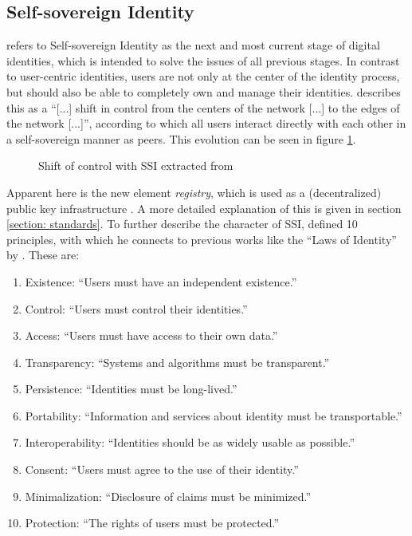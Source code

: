 	    \subsection{Self-sovereign Identity}\label{subsection: stage ssi}
	    \cite{allen_path_2016} refers to Self-sovereign Identity as the next and most current stage of digital identities, which is intended to solve the issues of all previous stages. In contrast to user-centric identities, users are not only at the center of the identity process, but should also be able to completely own and manage their identities. \cite[p. 12]{preukschat_self-sovereign_2021} describes this as a “[...] shift in control from the centers of the network [...] to the edges of the network [...]”, according to which all users interact directly with each other in a self-sovereign manner as peers. This evolution can be seen in figure \ref{figure: shift}. 
	    
	    \begin{figure}[ht]
    	    \centering
    	    \makebox[\textwidth]{}
            \caption{Shift of control with \acs{SSI} extracted from \cite[p. 12]{preukschat_self-sovereign_2021}}
            \label{figure: shift}
        \end{figure}
        
        Apparent here is the new element \textit{registry}, which is used as a (decentralized) public key infrastructure \cite[p. 89]{preukschat_self-sovereign_2021}. A more detailed explanation of this is given in section \ref{section: standards}. To further describe the character of \ac{SSI}, \cite{allen_path_2016} defined 10 principles, with which he connects to previous works like the “Laws of Identity” by \cite{cameron_laws_2005}. These are:
        
        \begin{enumerate}
        	\item Existence: “Users must have an independent existence.”
        	\item Control: “Users must control their identities.”
        	\item Access: “Users must have access to their own data.”
        	\item Transparency: “Systems and algorithms must be transparent.”
        	\item Persistence: “Identities must be long-lived.”
        	\item Portability: “Information and services about identity must be transportable.”
        	\item Interoperability: “Identities should be as widely usable as possible.”
        	\item Consent: “Users must agree to the use of their identity.”
        	\item Minimalization: “Disclosure of claims must be minimized.”
        	\item Protection: “The rights of users must be protected.”
        \end{enumerate}
	    
